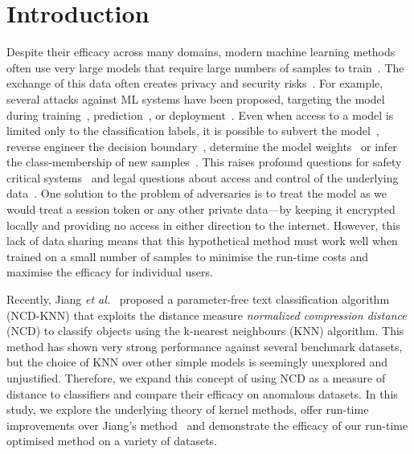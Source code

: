 \documentclass[conference]{IEEEtran}
\begin{document}
\section{Introduction}

Despite their efficacy across many domains, modern machine learning methods often use very large models that require large numbers of samples to train~\cite{desislavov2021compute}.
The exchange of this data often creates privacy and security risks~\cite{chakraborty_adversarial_2018,meyers}. For example, several attacks against ML systems have been proposed, targeting the model during training~\cite{biggio_poisoning_2013}, prediction~\cite{biggio_evasion_2013,deepfool,carlini_towards_2017}, or deployment~\cite{distributed_attacks,santos2021universal}.
Even when access to a model is limited only to the classification labels, it is possible to subvert the model~\cite{hopskipjump}, reverse engineer the decision boundary~\cite{deepfool}, determine the model weights~\cite{jagielski2020high} or infer the class-membership of new samples~\cite{bentley2020quantifying}. 
This raises profound questions for safety critical systems~\cite{meyers} and legal questions about access and control of the underlying data~\cite{mitrou2018data,marks2023ai}.
One solution to the problem of adversaries is to treat the model as we would treat a session token or any other private data---by keeping it encrypted locally and providing no access in either direction to the internet.
However, this lack of data sharing means that this hypothetical method must work well when trained on a small number of samples to minimise the run-time costs and maximise the efficacy for individual users.

Recently, Jiang \textit{et al.}~\cite{jiang2022less} proposed a parameter-free text classification algorithm (NCD-KNN) that exploits the distance measure \textit{normalized compression distance} (NCD) to classify objects using the k-nearest neighbours (KNN) algorithm.
This method has shown very strong performance against several benchmark datasets, but the choice of KNN over other simple models is seemingly unexplored and unjustified.
Therefore, we expand this concept of using NCD as a measure of distance to classifiers and compare their efficacy on anomalous datasets.
In this study, we explore the underlying theory of kernel methods, offer run-time improvements over Jiang's method~\cite{jiang2022less} and demonstrate the efficacy of our run-time optimised method on a variety of datasets.
\end{document}

